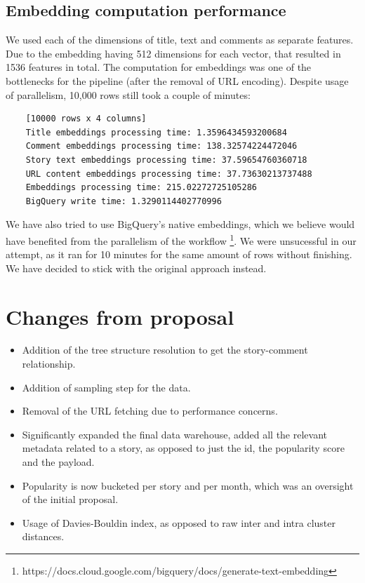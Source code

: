 \documentclass[nonacm,sigconf]{acmart}
\begin{document}
\subsection{Embedding computation performance}

We used each of the dimensions of title, text and comments as separate features. Due to the embedding having 512 dimensions for each vector, that resulted in 1536 features in total. The computation for embeddings was one of the bottlenecks for the pipeline (after the removal of URL encoding). Despite usage of parallelism, 10,000 rows still took a couple of minutes:

\begin{verbatim}
    [10000 rows x 4 columns]
    Title embeddings processing time: 1.3596434593200684
    Comment embeddings processing time: 138.32574224472046
    Story text embeddings processing time: 37.59654760360718
    URL content embeddings processing time: 37.73630213737488
    Embeddings processing time: 215.02272725105286
    BigQuery write time: 1.3290114402770996
\end{verbatim}

We have also tried to use BigQuery's native embeddings, which we believe would have benefited from the parallelism of the workflow \footnote{https://docs.cloud.google.com/bigquery/docs/generate-text-embedding}. We were unsucessful in our attempt, as it ran for 10 minutes for the same amount of rows without finishing. We have decided to stick with the original approach instead. 

\section{Changes from proposal}

\begin{itemize}
    \item Addition of the tree structure resolution to get the story-comment relationship.
    \item Addition of sampling step for the data.
    \item Removal of the URL fetching due to performance concerns.
    \item Significantly expanded the final data warehouse, added all the relevant metadata related to a story, as opposed to just the id, the popularity score and the payload.
    \item Popularity is now bucketed per story and per month, which was an oversight of the initial proposal.
    \item Usage of Davies-Bouldin index, as opposed to raw inter and intra cluster distances.
\end{itemize}
\end{document}
